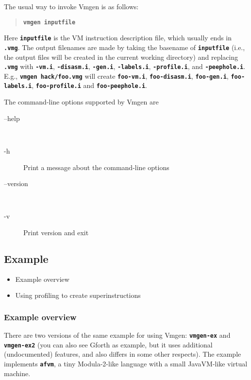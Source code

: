 \documentclass[10pt,english]{article}
\begin{document}
The usual way to invoke Vmgen is as follows:
\begin{quotation}
\texttt{\textbf{vmgen inputfile}}
\end{quotation}
Here \texttt{\textbf{inputfile}} is the VM instruction description
file, which usually ends in \texttt{\textbf{.vmg}}. The output filenames
are made by taking the basename of \texttt{\textbf{inputfile}} (i.e.,
the output files will be created in the current working directory)
and replacing \texttt{\textbf{.vmg}} with \texttt{\textbf{-vm.i}},
\texttt{\textbf{-disasm.i}}, \texttt{\textbf{-gen.i}}, \texttt{\textbf{-labels.i}},
\texttt{\textbf{-profile.i}}, and \texttt{\textbf{-peephole.i}}. E.g.,
\texttt{\textbf{vmgen hack/foo.vmg}} will create \texttt{\textbf{foo-vm.i}},
\texttt{\textbf{foo-disasm.i}}, \texttt{\textbf{foo-gen.i}}, \texttt{\textbf{foo-labels.i}},
\texttt{\textbf{foo-profile.i}} and \texttt{\textbf{foo-peephole.i}}.

The command-line options supported by Vmgen are
\begin{description}
\item [{--help}]~
\item [{-h}] Print a message about the command-line options
\item [{--version}]~
\item [{-v}] Print version and exit
\end{description}

\subsection{Example}
\begin{itemize}
\item Example overview
\item Using profiling to create superinstructions
\end{itemize}

\subsubsection{Example overview}

There are two versions of the same example for using Vmgen: \texttt{\textbf{vmgen-ex}}
and \texttt{\textbf{vmgen-ex2}} (you can also see Gforth as example,
but it uses additional (undocumented) features, and also differs in
some other respects). The example implements \texttt{\textbf{afvm}},
a tiny Modula-2-like language with a small JavaVM-like virtual machine.
\end{document}
